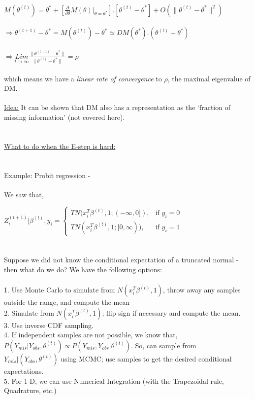 \documentclass[12pt]{article}
\begin{document}
\\
$M(\theta^{(t)})=\theta^* + \left[\frac{\partial}{\partial \theta}M(\theta) \biggr\rvert_{\theta=\theta^{*}}\right].[\theta^{(t)}-\theta^{*}]+ O(\|\theta^{(t)}-\theta^{*}\|^2)$\\
\\
$\Rightarrow \theta^{(t+1)}-\theta^{*}=M(\theta^{(t)})-\theta^{*} \simeq DM(\theta^{*}).(\theta^{(t)}-\theta^{*})$\\
\\
$\Rightarrow \underset{t\rightarrow\infty}{Lim} \frac{\|\theta^{(t+1)}-\theta^{*}\|}{\|\theta^{(t)}-\theta^{*}\|} = \rho$\\
\\
which means we have a \textit{linear rate of convergence} to $\rho$, the maximal eigenvalue of DM.\\
\\
\uline{Idea:} It can be shown that DM also has a representation as the \lq{}fraction of missing information\rq{} (not covered here).\\
\\
\\
\-\hspace{5 cm} \uline{What to do when the E-step is hard:}\\
\\
\\
Example: Probit regression - \\
\\
We saw that, 

$Z_i^{(t+1)} \Bigr\rvert \beta^{(t)},y_i=
\begin{cases}
    TN(x_i^{T}\beta^{(t)}, 1; (-\infty, 0]),& \text{if } y_i=0\\
    TN(x_i^{T}\beta^{(t)}, 1; [0, \infty)), & \text{if } y_i=1
\end{cases}$
\\
\\
\\
Suppose we did not know the conditional expectation of a truncated normal - then what do we do?
We have the following options:\\
\\
1. Use Monte Carlo to simulate from $N(x_i^{T}\beta^{(t)}, 1)$, throw away any samples outside the range, and compute the mean\\
2. Simulate from $N(x_i^T\beta^{(t)}, 1)$; flip sign if necessary and compute the mean.\\
3. Use inverse CDF sampling.\\
4. If independent samples are not possible, we know that, $P(Y_{mis}\Bigr\rvert Y_{obs}, \theta^{(t)}) \propto P(Y_{mis}, Y_{obs} \Bigr\rvert \theta^{(t)})$.  So, can sample from $Y_{mis}\Bigr\rvert (Y_{obs}, \theta^{(t)})$ using MCMC; use samples to get the desired conditional expectations.\\
5. For 1-D, we can use Numerical Integration (with the Trapezoidal rule, Quadrature, etc.)
\end{document}
